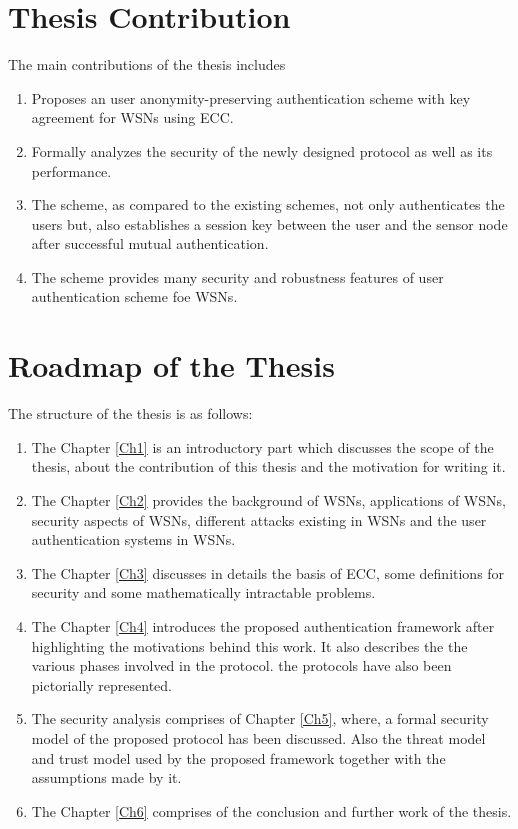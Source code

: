 \documentclass[a4paper,12pt]{report}
\begin{document}
\section{Thesis Contribution}
The main contributions of the thesis includes
\begin{enumerate}
\item Proposes an user anonymity-preserving authentication scheme with key agreement for WSNs using ECC.
\item Formally analyzes the security of the newly designed protocol as well as its performance.
\item The scheme, as compared to the existing schemes, not only authenticates the users but,
also establishes a session key between the user and the sensor node
after successful mutual authentication.
\item The scheme provides many security and robustness features of user authentication scheme foe WSNs.
\end{enumerate}

\section{Roadmap of the Thesis}
The structure of the thesis is as follows:
\begin{enumerate}
\item The Chapter \ref{Ch1} is an introductory part which
discusses the scope of the thesis, about the contribution of this
thesis and the motivation for writing it.

\item The Chapter \ref{Ch2} provides the background of WSNs,
applications of WSNs, security aspects of WSNs, different attacks
existing in WSNs and the user authentication systems in WSNs.

\item The Chapter \ref{Ch3} discusses in details
the basis of ECC, some definitions for security and some
mathematically intractable problems.

\item The Chapter \ref{Ch4} introduces the proposed
authentication framework after highlighting the motivations behind
this work. It also describes the the various phases involved in the
protocol. the protocols have also been pictorially represented.

\item The security analysis comprises of Chapter \ref{Ch5}, where, a formal
security model of the proposed protocol has been discussed. Also the
threat model and trust model used by the proposed framework together
with the assumptions made by it.

\item  The Chapter \ref{Ch6} comprises of the conclusion and further work of the thesis.
\end{enumerate}
\end{document}

